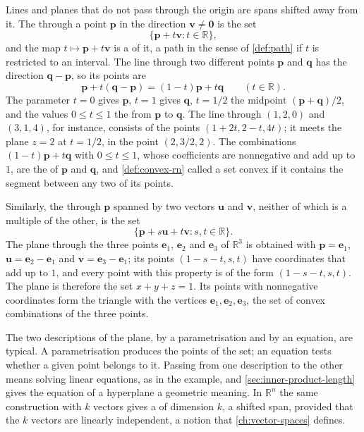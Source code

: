 Lines and planes that do not pass through the origin are spans shifted away from it. The  through a point $\mathbf p$ in the direction $\mathbf v\ne\mathbf 0$ is the set
\[
\{\mathbf p+t\mathbf v: t\in\mathbb R\},
\]
and the map $t\mapsto\mathbf p+t\mathbf v$ is a  of it, a path in the sense of \cref{def:path} if $t$ is restricted to an interval. The line through two different points $\mathbf p$ and $\mathbf q$ has the direction $\mathbf q-\mathbf p$, so its points are
\[
\mathbf p+t(\mathbf q-\mathbf p)=(1-t)\mathbf p+t\mathbf q\qquad(t\in\mathbb R).
\]
The parameter $t=0$ gives $\mathbf p$, $t=1$ gives $\mathbf q$, $t=1/2$ the midpoint $(\mathbf p+\mathbf q)/2$, and the values $0\le t\le1$ the  from $\mathbf p$ to $\mathbf q$. The line through $(1,2,0)$ and $(3,1,4)$, for instance, consists of the points $(1+2t,2-t,4t)$; it meets the plane $z=2$ at $t=1/2$, in the point $(2,3/2,2)$. The combinations $(1-t)\mathbf p+t\mathbf q$ with $0\le t\le1$, whose coefficients are nonnegative and add up to $1$, are the  of $\mathbf p$ and $\mathbf q$, and \cref{def:convex-rn} called a set convex if it contains the segment between any two of its points.

Similarly, the  through $\mathbf p$ spanned by two vectors $\mathbf u$ and $\mathbf v$, neither of which is a multiple of the other, is the set
\[
\{\mathbf p+s\mathbf u+t\mathbf v: s,t\in\mathbb R\}.
\]
The plane through the three points $\mathbf e_1$, $\mathbf e_2$ and $\mathbf e_3$ of $\mathbb R^3$ is obtained with $\mathbf p=\mathbf e_1$, $\mathbf u=\mathbf e_2-\mathbf e_1$ and $\mathbf v=\mathbf e_3-\mathbf e_1$; its points $(1-s-t,s,t)$ have coordinates that add up to $1$, and every point with this property is of the form $(1-s-t,s,t)$. The plane is therefore the set $x+y+z=1$. Its points with nonnegative coordinates form the triangle with the vertices $\mathbf e_1,\mathbf e_2,\mathbf e_3$, the set of convex combinations of the three points.

The two descriptions of the plane, by a parametrisation and by an equation, are typical. A parametrisation produces the points of the set; an equation tests whether a given point belongs to it. Passing from one description to the other means solving linear equations, as in the example, and \cref{sec:inner-product-length} gives the equation of a hyperplane a geometric meaning. In $\mathbb R^n$ the same construction with $k$ vectors gives a  of dimension $k$, a shifted span, provided that the $k$ vectors are linearly independent, a notion that \cref{ch:vector-spaces} defines.

